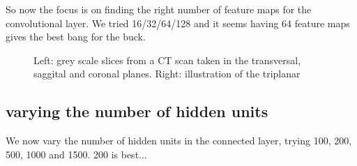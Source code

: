 So now the focus is on finding the right number of feature maps for the convolutional layer. We tried 16/32/64/128 and it seems having 64 feature maps gives the best bang for the buck.

\begin{figure}
\centering
\begin{minipage}{0.45\textwidth}
\centering
{}
\end{minipage}\hfill
\hspace{-1cm}
\begin{minipage}{0.45\textwidth}
\centering
{}
\end{minipage}
\caption{Left: grey scale slices from a CT scan taken in the transversal, saggital and coronal planes. Right: illustration of the triplanar}
\end{figure}

\subsection{varying the number of hidden units}

We now vary the number of hidden units in the connected layer, trying 100, 200, 500, 1000 and 1500. 200 is best...

